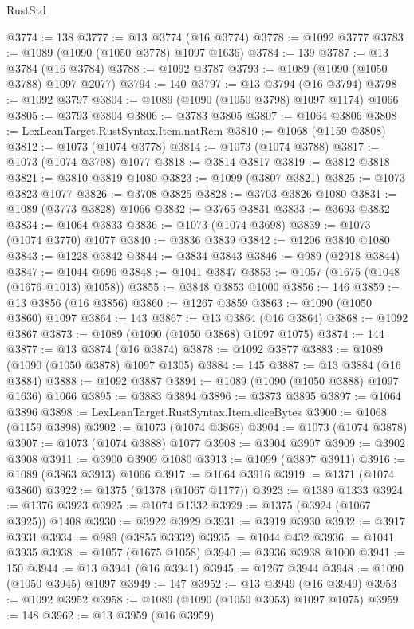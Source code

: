 \begin{lexlean}{RustStd}
\begin{coremodule}
@3774 := 138
@3777 := @13 @3774 (@16 @3774)
@3778 := @1092 @3777
@3783 := @1089 (@1090 (@1050 @3778) @1097 @1636)
@3784 := 139
@3787 := @13 @3784 (@16 @3784)
@3788 := @1092 @3787
@3793 := @1089 (@1090 (@1050 @3788) @1097 @2077)
@3794 := 140
@3797 := @13 @3794 (@16 @3794)
@3798 := @1092 @3797
@3804 := @1089 (@1090 (@1050 @3798) @1097 @1174) @1066
@3805 := @3793 @3804
@3806 := @3783 @3805
@3807 := @1064 @3806
@3808 := LexLeanTarget.RustSyntax.Item.natRem
@3810 := @1068 (@1159 @3808)
@3812 := @1073 (@1074 @3778)
@3814 := @1073 (@1074 @3788)
@3817 := @1073 (@1074 @3798) @1077
@3818 := @3814 @3817
@3819 := @3812 @3818
@3821 := @3810 @3819 @1080
@3823 := @1099 (@3807 @3821)
@3825 := @1073 @3823 @1077
@3826 := @3708 @3825
@3828 := @3703 @3826 @1080
@3831 := @1089 (@3773 @3828) @1066
@3832 := @3765 @3831
@3833 := @3693 @3832
@3834 := @1064 @3833
@3836 := @1073 (@1074 @3698)
@3839 := @1073 (@1074 @3770) @1077
@3840 := @3836 @3839
@3842 := @1206 @3840 @1080
@3843 := @1228 @3842
@3844 := @3834 @3843
@3846 := @989 (@2918 @3844)
@3847 := @1044 @696
@3848 := @1041 @3847
@3853 := @1057 (@1675 (@1048 (@1676 @1013) @1058))
@3855 := @3848 @3853 @1000
@3856 := 146
@3859 := @13 @3856 (@16 @3856)
@3860 := @1267 @3859
@3863 := @1090 (@1050 @3860) @1097
@3864 := 143
@3867 := @13 @3864 (@16 @3864)
@3868 := @1092 @3867
@3873 := @1089 (@1090 (@1050 @3868) @1097 @1075)
@3874 := 144
@3877 := @13 @3874 (@16 @3874)
@3878 := @1092 @3877
@3883 := @1089 (@1090 (@1050 @3878) @1097 @1305)
@3884 := 145
@3887 := @13 @3884 (@16 @3884)
@3888 := @1092 @3887
@3894 := @1089 (@1090 (@1050 @3888) @1097 @1636) @1066
@3895 := @3883 @3894
@3896 := @3873 @3895
@3897 := @1064 @3896
@3898 := LexLeanTarget.RustSyntax.Item.sliceBytes
@3900 := @1068 (@1159 @3898)
@3902 := @1073 (@1074 @3868)
@3904 := @1073 (@1074 @3878)
@3907 := @1073 (@1074 @3888) @1077
@3908 := @3904 @3907
@3909 := @3902 @3908
@3911 := @3900 @3909 @1080
@3913 := @1099 (@3897 @3911)
@3916 := @1089 (@3863 @3913) @1066
@3917 := @1064 @3916
@3919 := @1371 (@1074 @3860)
@3922 := @1375 (@1378 (@1067 @1177))
@3923 := @1389 @1333
@3924 := @1376 @3923
@3925 := @1074 @1332
@3929 := @1375 (@3924 (@1067 @3925)) @1408
@3930 := @3922 @3929
@3931 := @3919 @3930
@3932 := @3917 @3931
@3934 := @989 (@3855 @3932)
@3935 := @1044 @432
@3936 := @1041 @3935
@3938 := @1057 (@1675 @1058)
@3940 := @3936 @3938 @1000
@3941 := 150
@3944 := @13 @3941 (@16 @3941)
@3945 := @1267 @3944
@3948 := @1090 (@1050 @3945) @1097
@3949 := 147
@3952 := @13 @3949 (@16 @3949)
@3953 := @1092 @3952
@3958 := @1089 (@1090 (@1050 @3953) @1097 @1075)
@3959 := 148
@3962 := @13 @3959 (@16 @3959)

\end{coremodule}
\end{lexlean}
